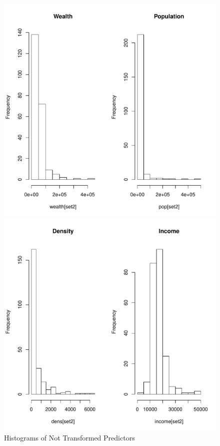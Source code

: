 \documentclass{article}\usepackage[]{graphicx}\usepackage[]{color}
\makeatletter
\def\maxwidth{ %
  \ifdim\Gin@nat@width>\linewidth
    \linewidth
  \else
    \Gin@nat@width
  \fi
}
\newenvironment{knitrout}{}{} %
\makeatother
\begin{document}
%
\begin{figure}
  \begin{center}
    \caption{Histograms of Not Transformed Predictors}
      \label{regular}
\begin{knitrout}
\color{fgcolor}
\includegraphics[width=\maxwidth,height=0.3\textheight]{figure/Not_Transformed_Predictors-1} 

\includegraphics[width=\maxwidth,height=0.3\textheight]{figure/Not_Transformed_Predictors-2} 


\end{knitrout}
\end{center}
\end{figure}
\end{document}
